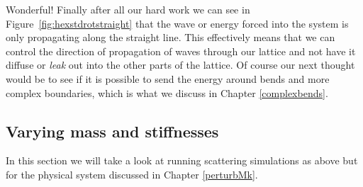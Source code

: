 Wonderful! Finally after all our hard work we can see in
Figure~\ref{fig:hexstdrotstraight} that the wave or energy forced into the
system is only propagating along the straight line. This effectively means that
we can control the direction of propagation of waves through our lattice and
not have it diffuse or \textit{leak} out into the other parts of the lattice.
Of course our next thought would be to see if it is possible to send the energy
around bends and more complex boundaries, which is what we discuss in Chapter
\ref{complexbends}.

\subsection{Varying mass and stiffnesses}
In this section we will take a look at running scattering simulations as above
but for the physical system discussed in Chapter \ref{perturbMk}.

